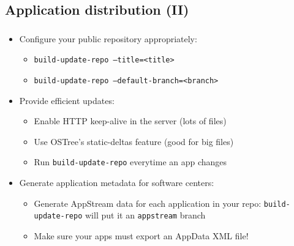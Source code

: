 \subsection{Application distribution (II)}
\begin{frame}
  \frametitle{\insertsubsection}

  \begin{itemize}
  \item Configure your public repository appropriately:
    \begin{itemize}
    \item \texttt{build-update-repo --title=<title>}\vspacing
    \item \texttt{build-update-repo --default-branch=<branch>}\vspacing
    \end{itemize}
  \item Provide efficient updates:
    \begin{itemize}
    \item Enable HTTP keep-alive in the server (lots of files)\vspacing
    \item Use OSTree's static-deltas feature (good for big files)\vspacing
    \item Run \texttt{build-update-repo} everytime an app changes\vspacing
    \end{itemize}
  \item Generate application metadata for software centers:
    \begin{itemize}
    \item Generate AppStream data for each application in your repo: \texttt{build-update-repo} will put it an \texttt{appstream} branch\vspacing
    \item Make sure your apps must export an AppData XML file!
    \end{itemize}
  \end{itemize}
\end{frame}

